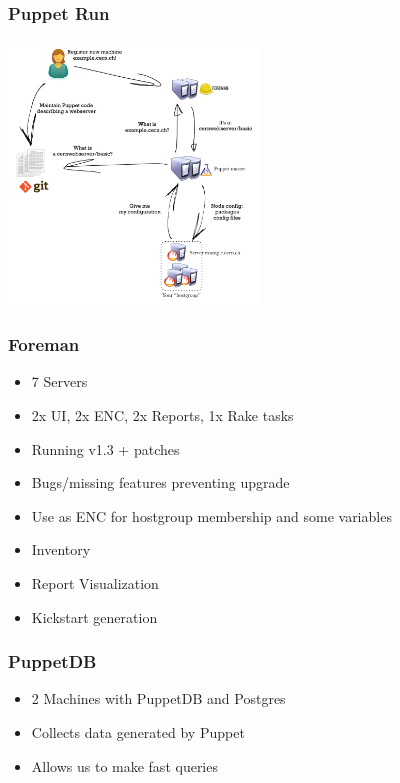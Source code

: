 \documentclass[aspectratio=169]{beamer}
\begin{document}

\begin{frame}
    \frametitle{Puppet Run}
    \vspace{-1em}
    \begin{center}
        \includegraphics[width=0.5\textwidth]{puppetrun3.png}
    \end{center}
\end{frame}


\begin{frame}
    \frametitle{Foreman}
    \begin{itemize}
        \item 7 Servers
        \item 2x UI, 2x ENC, 2x Reports, 1x Rake tasks
        \item Running v1.3 + patches
        \item Bugs/missing features preventing upgrade
        \item Use as ENC for hostgroup membership and some variables
        \item Inventory
        \item Report Visualization
        \item Kickstart generation
    \end{itemize}
\end{frame}


\begin{frame}
    \frametitle{PuppetDB}
    \begin{itemize}
        \item 2 Machines with PuppetDB and Postgres
        \item Collects data generated by Puppet
        \item Allows us to make fast queries
    \end{itemize}
\end{frame}
\end{document}
